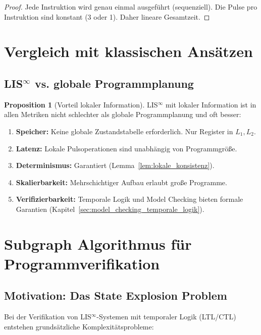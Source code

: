 \documentclass[a4paper,12pt]{article}
\theoremstyle{definition}
\newtheorem{proposition}{Proposition}
\begin{document}
\begin{proof}
	Jede Instruktion wird genau einmal ausgeführt (sequenziell). Die Pulse pro Instruktion sind konstant (3 oder 1). Daher lineare Gesamtzeit.
\end{proof}

\section{Vergleich mit klassischen Ansätzen}
\label{sec:vergleich_klassisch}

\subsection{LIS$^{\infty}$ vs. globale Programmplanung}

\begin{proposition}[Vorteil lokaler Information]
	LIS$^{\infty}$ mit lokaler Information ist in allen Metriken nicht schlechter als globale Programmplanung und oft besser:
	\begin{enumerate}
		\item \textbf{Speicher:} Keine globale Zustandstabelle erforderlich. Nur Register in $L_1, L_2$.
		\item \textbf{Latenz:} Lokale Pulsoperationen sind unabhängig von Programmgröße.
		\item \textbf{Determinismus:} Garantiert (Lemma~\ref{lem:lokale_konsistenz}).
		\item \textbf{Skalierbarkeit:} Mehrschichtiger Aufbau erlaubt große Programme.
		\item \textbf{Verifizierbarkeit:} Temporale Logik und Model Checking bieten formale Garantien (Kapitel~\ref{sec:model_checking_temporale_logik}).
	\end{enumerate}
\end{proposition}

\section{Subgraph Algorithmus für Programmverifikation}
\label{sec:subgraph_algorithmus}

\subsection{Motivation: Das State Explosion Problem}

Bei der Verifikation von LIS$^{\infty}$-Systemen mit temporaler Logik (LTL/CTL) entstehen grundsätzliche Komplexitätsprobleme:
\end{document}
